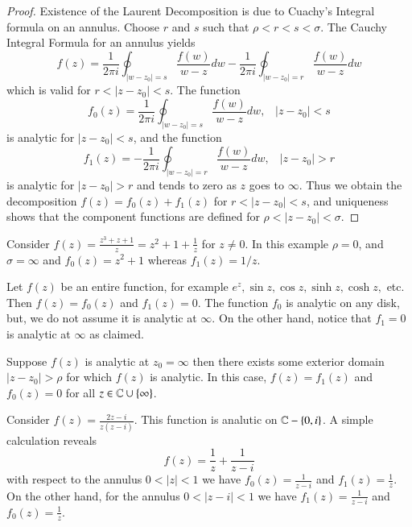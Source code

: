 \documentclass[12pt, a4paper, oneside, openright, titlepage]{book}
\begin{document}
\begin{proof}
    Existence of the Laurent Decomposition is due to Cuachy's Integral formula on an annulus. Choose $r$ and $s$ such that $\rho < r < s < \sigma$. The Cauchy Integral Formula for an annulus yields \begin{equation*}
        f(z) = \frac{1}{2\pi i}\oint_{|w-z_0|=s}\frac{f(w)}{w-z}dw - \frac{1}{2\pi i}\oint_{|w-z_0| = r}\frac{f(w)}{w-z}dw 
    \end{equation*}
    which is valid for $r < |z-z_0| < s$. The function \begin{equation*}
        f_0(z) = \frac{1}{2\pi i}\oint_{|w-z_0|=s}\frac{f(w)}{w-z}dw,\;\;\;|z-z_0| < s
    \end{equation*}
    is analytic for $|z-z_0| < s$, and the function \begin{equation*}
        f_1(z) = - \frac{1}{2\pi i}\oint_{|w-z_0| = r}\frac{f(w)}{w-z}dw ,\;\;\;|z-z_0| > r
    \end{equation*}
    is analytic for $|z-z_0| > r$ and tends to zero as $z$ goes to $\infty$. Thus we obtain the decomposition $f(z) = f_0(z) + f_1(z)$ for $r < |z-z_0| <s$, and uniqueness shows that the component functions are defined for $\rho < |z-z_0| < \sigma$.
\end{proof}

\begin{eg}
    Consider $f(z) = \frac{z^3+z+1}{z} = z^2+1+\frac{1}{z}$ for $z \neq 0$. In this example $\rho = 0$, and $\sigma = \infty$ and $f_0(z) = z^2+1$ whereas $f_1(z) = 1/z$.
\end{eg}


\begin{eg}
    Let $f(z)$ be an entire function, for example $e^z, \sin z,\cos z, \sinh z,\cosh z,$ etc. Then $f(z) = f_0(z)$ and $f_1(z) = 0$. The function $f_0$ is analytic on any disk, but, we do not assume it is analytic at $\infty$. On the other hand, notice that $f_1 = 0$ is analytic at $\infty$ as claimed.
\end{eg}

\begin{eg}
    Suppose $f(z)$ is analytic at $z_0 = \infty$ then there exists some exterior domain $|z-z_0| > \rho$ for which $f(z)$ is analytic. In this case, $f(z) = f_1(z)$ and $f_0(z) = 0$ for all $z \in \mathbb C\cup\{\infty\}$.
\end{eg}



\begin{eg}
    Consider $f(z) = \frac{2z-i}{z(z-i)}$. This function is analutic on $\mathbb C-\{0,i\}$. A simple calculation reveals \begin{equation*}
        f(z) = \frac{1}{z} + \frac{1}{z-i}
    \end{equation*}
    with respect to the annulus $0 < |z| < 1$ we have $f_0(z) = \frac{1}{z-i}$ and $f_1(z) = \frac{1}{z}$. On the other hand, for the annulus $0 < |z-i| < 1$ we have $f_1(z) = \frac{1}{z-i}$ and $f_0(z) = \frac{1}{z}$.
\end{eg}
\end{document}
